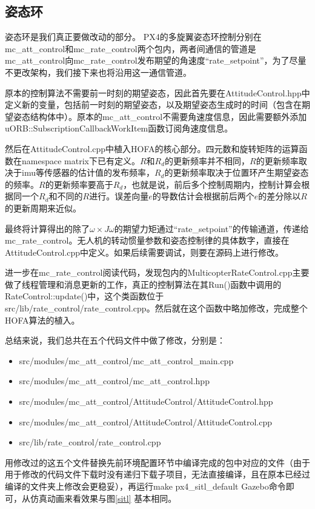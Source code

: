 




\subsection*{姿态环}
姿态环是我们真正要做改动的部分。
PX4的多旋翼姿态环控制分别在mc\_att\_control和mc\_rate\_control两个包内，两者间通信的管道是mc\_att\_control向mc\_rate\_control发布期望的角速度“rate\_setpoint”，为了尽量不更改架构，我们接下来也将沿用这一通信管道。

原本的控制算法不需要前一时刻的期望姿态，因此首先要在AttitudeControl.hpp中定义新的变量，包括前一时刻的期望姿态，以及期望姿态生成时的时间（包含在期望姿态结构体中）。原本的mc\_att\_control不需要角速度信息，因此需要额外添加uORB::SubscriptionCallbackWorkItem函数订阅角速度信息。

然后在AttitudeControl.cpp中植入HOFA的核心部分。四元数和旋转矩阵的运算函数在namespace matrix下已有定义。$R$和$R_d$的更新频率并不相同，$R$的更新频率取决于imu等传感器的估计值的发布频率，$R_d$的更新频率取决于位置环产生期望姿态的频率。$R$的更新频率要高于$R_d$，也就是说，前后多个控制周期内，控制计算会根据同一个$R_d$和不同的$R$进行。误差向量$e$的导数估计会根据前后两个$e$的差分除以$R$的更新周期来近似。

最终将计算得出的除了$\omega \times J\omega$的期望力矩通过“rate\_setpoint”的传输通道，传递给mc\_rate\_control。无人机的转动惯量参数和姿态控制律的具体数字，直接在AttitudeControl.cpp中定义。如果后续需要调试，则要在源码上进行修改。

进一步在mc\_rate\_control阅读代码，发现包内的MulticopterRateControl.cpp主要做了线程管理和消息更新的工作，真正的控制算法在其Run()函数中调用的RateControl::update()中，这个类函数位于src/lib/rate\_control/rate\_control.cpp。然后就在这个函数中略加修改，完成整个HOFA算法的植入。

总结来说，我们总共在五个代码文件中做了修改，分别是：
\begin{itemize}
  \item src/modules/mc\_att\_control/mc\_att\_control\_main.cpp
  \item src/modules/mc\_att\_control/mc\_att\_control.hpp
  \item src/modules/mc\_att\_control/AttitudeControl/AttitudeControl.hpp
  \item src/modules/mc\_att\_control/AttitudeControl/AttitudeControl.cpp
  \item src/lib/rate\_control/rate\_control.cpp
\end{itemize}
用修改过的这五个文件替换先前环境配置环节中编译完成的包中对应的文件（由于用于修改的代码文件下载时没有递归下载子项目，无法直接编译，且在原本已经过编译的文件夹上修改会更稳妥），再运行make px4\_sitl\_default Gazebo命令即可，从仿真动画来看效果与图\ref{sitl} 基本相同。



